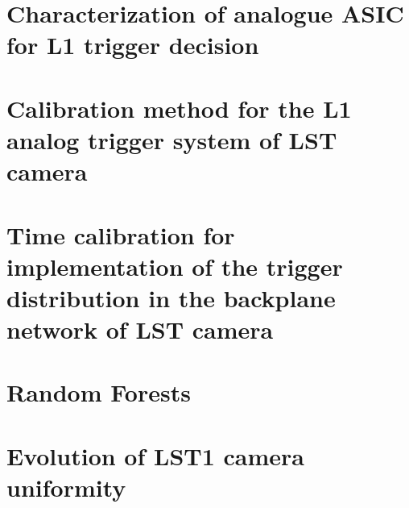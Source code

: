 \documentclass[12pt,fleqn,aas_macros]{book} %
\begin{document}
\chapter[Characterization of analogue ASIC for L1 trigger decision]{Characterization of analogue ASIC for L1 trigger decision}
\label{app:asic}


\chapter[Calibration method for the L1 analog trigger system of LST camera]{Calibration method for the L1 analog trigger system of LST camera}
\label{app:calib}


\chapter[Time calibration for implementation of the trigger distribution in the backplane network of LST camera]{Time calibration for implementation of the trigger distribution in the backplane network of LST camera}
\label{app:timecal}


\chapter[Random Forests]{Random Forests}
\label{app:rf}


\chapter[Evolution of LST1 camera uniformity]{Evolution of LST1 camera uniformity}
\label{app:lstcamevo}


\printbibliography
\printglossaries
\end{document}
